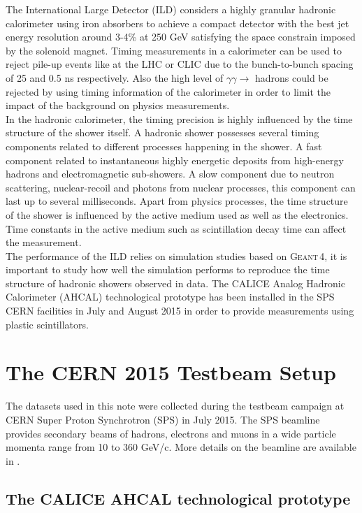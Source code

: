 \documentclass[twoside,a4paper,11pt]{article}
\newcommand\geant{\textsc{Geant\,4}\xspace}
\begin{document}
The International Large Detector (ILD) considers a highly granular hadronic calorimeter using iron absorbers to achieve a compact detector with the best jet energy resolution around 3-4\% at 250 GeV satisfying the space constrain imposed by the solenoid magnet. Timing measurements in a calorimeter can be used to reject pile-up events like at the LHC or CLIC due to the bunch-to-bunch spacing of 25 and 0.5 ns respectively. Also the high level of $\gamma\gamma \rightarrow$ hadrons could be rejected by using timing information of the calorimeter in order to limit the impact of the background on physics measurements.\\
In the hadronic calorimeter, the timing precision is highly influenced by the time structure of the shower itself. A hadronic shower possesses several timing components related to different processes happening in the shower. A fast component related to instantaneous highly energetic deposits from high-energy hadrons and electromagnetic sub-showers. A slow component due to neutron scattering, nuclear-recoil and photons from nuclear processes, this component can last up to several milliseconds. Apart from physics processes, the time structure of the shower is influenced by the active medium used as well as the electronics. Time constants in the active medium such as scintillation decay time can affect the measurement.\\
The performance of the ILD relies on simulation studies based on \geant, it is important to study how well the simulation performs to reproduce the time structure of hadronic showers observed in data. The CALICE Analog Hadronic Calorimeter (AHCAL) technological prototype has been installed in the SPS CERN facilities in July and August 2015 in order to provide measurements using plastic scintillators.

\section{The CERN 2015 Testbeam Setup}

The datasets used in this note were collected during the testbeam campaign at CERN Super Proton Synchrotron (SPS) in July 2015. The SPS beamline provides secondary beams of hadrons, electrons and muons in a wide particle momenta range from 10 to 360 GeV/c. More details on the beamline are available in \cite{SPSBeamLine}.

\subsection{The CALICE AHCAL technological prototype}
\end{document}
